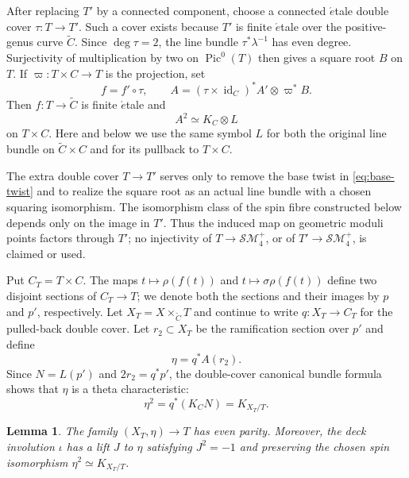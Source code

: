 \documentclass[11pt,a4paper,dvipsnames]{amsart}
\numberwithin{equation}{section}
\theoremstyle{plain}
\newtheorem{lemma}[theorem]{Lemma}
\theoremstyle{definition}
\newcommand{\SM}{\mathcal S\mathcal M}
\newcommand{\Pic}{\operatorname{Pic}}
\newcommand{\id}{\operatorname{id}}
\begin{document}
After replacing $T'$ by a connected component, choose a connected
$\acute{e}$tale double cover $\tau:T\to T'$.  Such a cover exists because
$T'$ is finite $\acute{e}$tale over the positive-genus curve
$\widetilde C$.  Since $\deg\tau=2$, the line bundle $\tau^*\lambda^{-1}$ has
even degree.  Surjectivity of multiplication by two on $\Pic^0(T)$
then gives a square root $B$ on $T$.  If $\varpi:T\times C\to T$ is the projection, set
$$
 f=f'\circ\tau,
 \qquad
 A=(\tau\times\id_C)^* A'\otimes\varpi^*B.
$$
Then $f:T\to\widetilde C$ is finite $\acute{e}$tale and
\begin{equation}\label{eq:A}
 A^2\simeq K_C\otimes L
\end{equation}
on $T\times C$.  Here and below we use the same symbol $L$ for both the original line bundle on
$\widetilde C\times C$
and for its
pullback to
$T\times C$.

The extra double cover $T\to T'$ serves only to remove the base twist in
\eqref{eq:base-twist} and to realize the square root as an actual line
bundle with a chosen squaring isomorphism.  The isomorphism class of the
spin fibre constructed below depends only on the image in $T'$.  Thus the
induced map on geometric moduli points factors through $T'$; no
injectivity of $T\to\SM_4^+$, or of $T'\to\SM_4^+$, is claimed or used.

Put $C_T=T\times C$.  The maps
$t\mapsto\rho(f(t))$ and $t\mapsto\sigma\rho(f(t))$ define two disjoint
sections of $C_T\to T$; we denote both the sections and their images by
$p$ and $p'$, respectively.  Let
$X_T=X\times_{\widetilde C}T$ and continue to write
$q:X_T\to C_T$ for the pulled-back double cover.  Let $r_2\subset X_T$ be
the ramification section over $p'$ and define
\begin{equation}\label{eq:eta}
 \eta=q^*A(r_2).
\end{equation}
Since $N=L(p')$ and $2r_2=q^*p'$, the double-cover canonical
bundle formula shows that $\eta$ is a theta characteristic:
\begin{equation}\label{eq:eta-spin}
 \eta^2=q^*(K_C N)=K_{X_T/T}.
\end{equation}

\begin{lemma}\label{lem:parity-and-lift}
The family $(X_T,\eta)\to T$ has even parity.  Moreover, the deck involution
$\iota$ has a lift $J$ to $\eta$ satisfying $J^2=-1$ and preserving
the chosen spin isomorphism $\eta^2\simeq K_{X_T/T}$.
\end{lemma}
\end{document}
